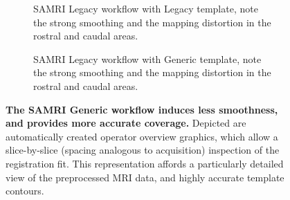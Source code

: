 \begin{figure}[h!]
\begin{subfigure}[t]{0.48\textwidth}
{			}
		\caption{
			SAMRI Legacy workflow with Legacy template, note the strong smoothing and the mapping distortion in the rostral and caudal areas.
			}
		\label{fig:fit_ll}
	\end{subfigure}\hfill
	\begin{subfigure}[t]{0.48\textwidth}
		\centering
		\setlength{\fboxsep}{0pt}%
		\setlength{\fboxrule}{0.2pt}%
		\caption{
			SAMRI Legacy workflow with Generic template, note the strong smoothing and the mapping distortion in the rostral and caudal areas.
			}
		\label{fig:fit_lg}
	\end{subfigure}
	\caption{
		\textbf{The SAMRI Generic workflow induces less smoothness, and provides more accurate coverage.}
		Depicted are automatically created operator overview graphics, which allow a slice-by-slice (spacing analogous to acquisition) inspection of the registration fit.
		This representation affords a particularly detailed view of the preprocessed MRI data, and highly accurate template contours.
		}
	\label{fig:fit}
\end{figure}

